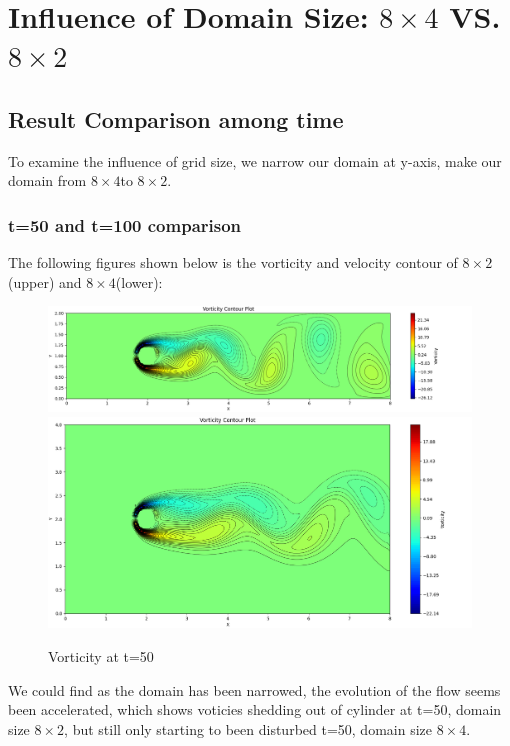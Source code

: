 \documentclass[12pt]{article}
\begin{document}

\newpage
\section{Influence of Domain Size: $ 8 \times 4 $ VS. $ 8 \times 2 $}
\subsection{Result Comparison among time }

To examine the influence of grid size, we narrow our domain at y-axis, make our domain from $ 8 \times 4 $to $ 8 \times 2$.


\subsubsection{t=50 and t=100 comparison}

The following figures shown below is the vorticity and velocity contour of $ 8 \times 2 $(upper) and $ 8 \times 4$(lower):
\begin{figure}[H]
    \centering
    \includegraphics[width=0.6\linewidth]{figure/N32_Re150_8x2_t50/vor_N32_Re150_8x2_t50.jpg}
    \includegraphics[width=0.6\linewidth]{figure/N32_Re150_8x4_t50/vor_N32_Re150_8x4_t50.jpg}
    \caption{Vorticity at t=50}
\end{figure}

We could find as the domain has been narrowed, the evolution of the flow seems been accelerated, which shows voticies shedding out of cylinder at t=50, domain size $ 8 \times 2$, but still only starting to been disturbed t=50, domain size $ 8 \times 4$. 
\end{document}
